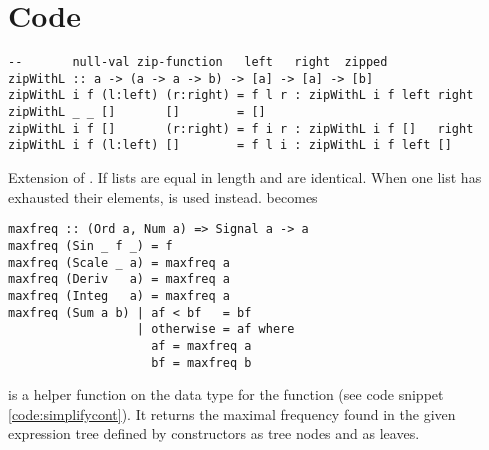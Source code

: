
\section{Code}\label{sec:appcode}
\begin{codefig}
\begin{verbatim}
--       null-val zip-function   left   right  zipped
zipWithL :: a -> (a -> a -> b) -> [a] -> [a] -> [b]
zipWithL i f (l:left) (r:right) = f l r : zipWithL i f left right
zipWithL _ _ []       []        = []
zipWithL i f []       (r:right) = f i r : zipWithL i f []   right
zipWithL i f (l:left) []        = f l i : zipWithL i f left []
\end{verbatim}
\caption{Extension of . If lists are equal in length  and  are identical. When one list has exhausted their elements,  is used instead.  becomes }
\label{sec:appcodezipwithl}
\end{codefig}

\begin{codefig}
\begin{verbatim}
maxfreq :: (Ord a, Num a) => Signal a -> a
maxfreq (Sin _ f _) = f
maxfreq (Scale _ a) = maxfreq a
maxfreq (Deriv   a) = maxfreq a
maxfreq (Integ   a) = maxfreq a
maxfreq (Sum a b) | af < bf   = bf
                  | otherwise = af where
                    af = maxfreq a
                    bf = maxfreq b
\end{verbatim}
\caption{ is a helper function on the  data type for the function  (see code snippet \ref{code:simplifycont}). It returns the maximal frequency found in the given  expression tree defined by  constructors as tree nodes and  as leaves.}
\label{sec:appcodemaxfreq}
\end{codefig}

